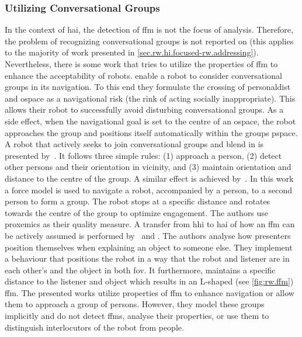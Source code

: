 \subsubsection{Utilizing Conversational Groups}\label{sec.rw.hi.focused-rw.mixedgroups}
In the context of \gls{hai}, the detection of \gls{ffm} is not the focus of analysis.
Therefore, the problem of recognizing \glspl{conversational group} is not reported on (this applies to the majority of work presented in \cref{sec.rw.hi.focused-rw.addressing}).
Nevertheless, there is some work that tries to utilize the properties of \gls{ffm} to enhance the acceptability of \glspl{robot}.
 enable a \gls{robot} to consider \glspl{conversational group} in its navigation.
To this end they formulate the crossing of \gls{personaldist} and \gls{ospace} as a navigational risk (the rink of acting socially inappropriate).
This allows their \gls{robot} to successfully avoid disturbing \glspl{conversational group}.
As a side effect, when the navigational goal is set to the centre of an \gls{ospace}, the \gls{robot} approaches the group and positions itself automatically within the groups \gls{pspace}.
A \gls{robot} that actively seeks to join \glspl{conversational group} and blend in is presented by~.
It follows three simple rules: (1) approach a person, (2) detect other persons and their orientation in vicinity, and (3) maintain orientation and distance to the centre of the group.
A similar effect is achieved by~.
In this work a force model is used to navigate a \gls{robot}, accompanied by a person, to a second person to form a group.
The \gls{robot} stops at a specific distance and rotates towards the centre of the group to optimize engagement.
The authors use \gls{proxemics} as their quality measure.
A transfer from \gls{hhi} to \gls{hai} of how an \gls{ffm} can be actively assumed is performed by~ and .
The authors analyse how presenters position themselves when explaining an object to someone else.
They implement a behaviour that positions the \gls{robot} in a way that the \gls{robot} and listener are in each other's and the object in both \gls{fov}.
It furthermore, maintains a specific distance to the listener and object which results in an L-shaped (see \cref{fig:rw.ffm}) \gls{ffm}.
The presented works utilize properties of \gls{ffm} to enhance  navigation or allow them to approach a group of persons.
However, they model these groups implicitly and do not detect \glspl{ffm}, analyse their properties, or use them to distinguish interlocutors of the \gls{robot} from  people.


